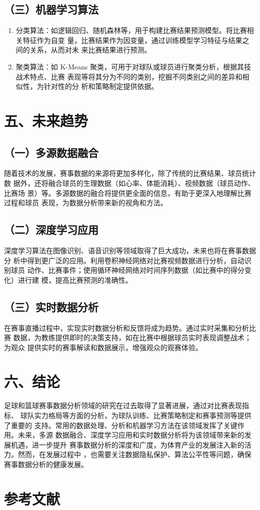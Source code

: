 \documentclass[UTF8]{ctexart}
\begin{document}
	\subsection*{（三）机器学习算法}
	\begin{enumerate}
		\item 分类算法：如逻辑回归、随机森林等，用于构建比赛结果预测模型。将比赛相关特征作为自变
		量，比赛结果作为因变量，通过训练模型学习特征与结果之间的关系，从而对未
		来比赛结果进行预测。
		\item 聚类算法：如 K-Means 聚类，可用于对球队或球员进行聚类分析，根据其技战术特点、比赛
		表现等将其分为不同的类别，挖掘不同类别之间的差异和相似性，为针对性的分
		析和策略制定提供依据。
	\end{enumerate}
	
	\section*{五、未来趋势}
	
	\subsection*{（一）多源数据融合}
	随着技术的发展，赛事数据的来源将更加多样化，除了传统的比赛结果、球员统计数
	据外，还将融合球员的生理数据（如心率、体能消耗）、视频数据（球员动作、比赛场
	景）等。多源数据的融合将提供更全面的信息，有助于更深入地理解比赛过程和球员
	表现，为数据分析带来新的视角和方法。
	
	\subsection*{（二）深度学习应用}
	深度学习算法在图像识别、语音识别等领域取得了巨大成功，未来也将在赛事数据分
	析中得到更广泛的应用。利用卷积神经网络对比赛视频数据进行分析，自动识别球员
	动作、比赛事件；使用循环神经网络对时间序列数据（如比赛中的得分变化）进行建
	模，提高比赛预测的准确性。
	
	\subsection*{（三）实时数据分析}
	在赛事直播过程中，实现实时数据分析和反馈将成为趋势。通过实时采集和分析比赛
	数据，为教练提供即时的决策支持，如在比赛中根据球员实时表现调整战术；为观众
	提供实时的赛事解读和数据展示，增强观众的观赛体验。
	
	\section*{六、结论}
	足球和篮球赛事数据分析领域的研究在过去取得了显著进展，通过对比赛表现指标、
	球队实力格局等方面的分析，为球队训练、比赛策略制定和赛事预测等提供了重要的
	支持。常用的数据处理、分析和机器学习方法在该领域发挥了关键作用。未来，多源
	数据融合、深度学习应用和实时数据分析将为该领域带来新的发展机遇，进一步提升
	赛事数据分析的深度和广度，为体育产业的发展注入新的活力。然而，在发展过程中
	，也需要关注数据隐私保护、算法公平性等问题，确保赛事数据分析的健康发展。
	
	\section*{参考文献}
	
	\printbibliography %
	
\end{document}
